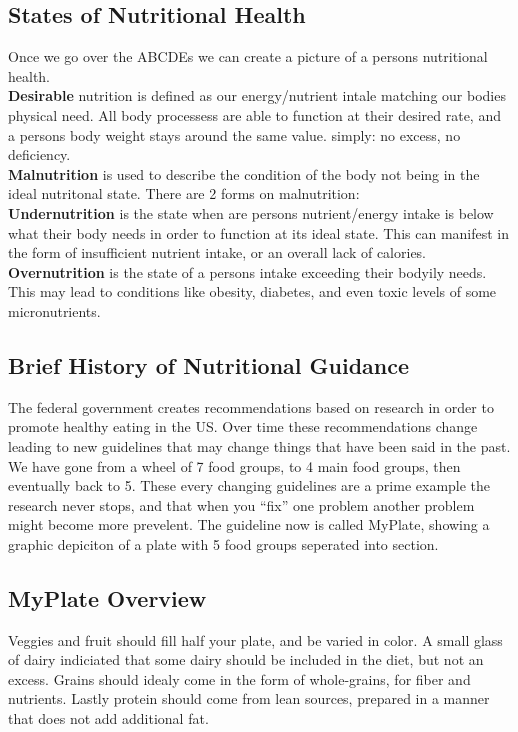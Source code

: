 \documentclass[letterpaper, 11pt]{article}
\begin{document}
\subsection{States of Nutritional Health}
\label{sec:orge753a08}
Once we go over the ABCDEs we can create a picture of a persons nutritional health.\\
\textbf{Desirable} nutrition is defined as our energy/nutrient intale matching our bodies physical need. All body processess are able to function at their desired rate, and a persons body weight stays around the same value. simply: no excess, no deficiency.\\
\textbf{Malnutrition} is used to describe the condition of the body not being in the ideal nutritonal state. There are 2 forms on malnutrition:\\
\textbf{Undernutrition} is the state when are persons nutrient/energy intake is below what their body needs in order to function at its ideal state. This can manifest in the form of insufficient nutrient intake, or an overall lack of calories.\\
\textbf{Overnutrition} is the state of a persons intake exceeding their bodyily needs. This may lead to conditions like obesity, diabetes, and even toxic levels of some micronutrients.\\
\subsection{Brief History of Nutritional Guidance}
\label{sec:org16d3136}
The federal government creates recommendations based on research in order to promote healthy eating in the US. Over time these recommendations change leading to new guidelines that may change things that have been said in the past. We have gone from a wheel of 7 food groups, to 4 main food groups, then eventually back to 5. These every changing guidelines are a prime example the research never stops, and that when you ``fix'' one problem another problem might become more prevelent. The guideline now is called MyPlate, showing a graphic depiciton of a plate with 5 food groups seperated into section.\\
\subsection{MyPlate Overview}
\label{sec:org88ae2b9}
Veggies and fruit should fill half your plate, and be varied in color. A small glass of dairy indiciated that some dairy should be included in the diet, but not an excess. Grains should idealy come in the form of whole-grains, for fiber and nutrients. Lastly protein should come from lean sources, prepared in a manner that does not add additional fat.\\
\end{document}
